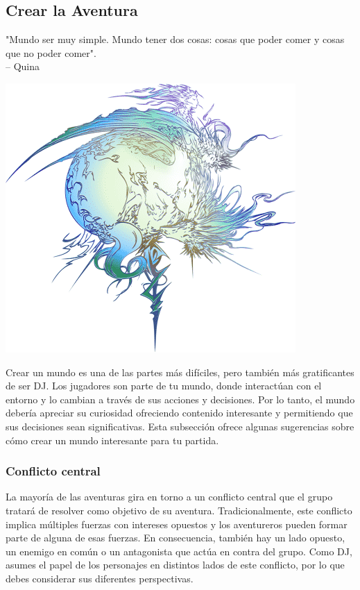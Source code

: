\subsection*{\hypertarget{world}{Crear la Aventura}}
%
"Mundo ser muy simple. Mundo tener dos cosas: cosas que poder comer y cosas que no poder comer".\\
\indent -- Quina

\begin{center} \includegraphics[width=1\columnwidth]{./art/images/ff13.png} \end{center}
\noindent
Crear un mundo es una de las partes más difíciles, pero también más gratificantes de ser DJ. Los jugadores son parte de tu mundo, donde interactúan con el entorno y lo cambian a través de sus acciones y decisiones. Por lo tanto, el mundo debería apreciar su curiosidad ofreciendo contenido interesante y permitiendo que sus decisiones sean significativas. Esta subsección ofrece algunas sugerencias sobre cómo crear un mundo interesante para tu partida.

\subsubsection*{Conflicto central}
La mayoría de las aventuras gira en torno a un conflicto central que el grupo tratará de resolver como objetivo de su aventura. Tradicionalmente, este conflicto implica múltiples fuerzas con intereses opuestos y los aventureros pueden formar parte de alguna de esas fuerzas. En consecuencia, también hay un lado opuesto, un enemigo en común o un antagonista que actúa en contra del grupo. Como DJ, asumes el papel de los personajes en distintos lados de este conflicto, por lo que debes considerar sus diferentes perspectivas.

